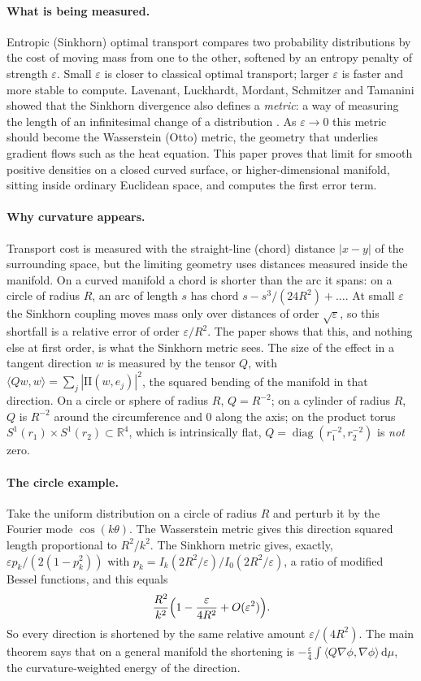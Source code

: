 \documentclass[11pt,a4paper]{article}
\theoremstyle{definition}\newtheorem{definition}[theorem]{Definition}
\theoremstyle{remark}\newtheorem{remark}[theorem]{Remark}
\newcommand{\eps}{\varepsilon}
\newcommand{\dd}{\,\mathrm d}
\newcommand{\R}{\mathbb R}
\newcommand{\II}{\mathrm{II}}
\begin{document}
\paragraph{What is being measured.} Entropic (Sinkhorn) optimal transport compares two probability distributions by the cost of moving mass from one to the other, softened by an entropy penalty of strength $\eps$. Small $\eps$ is closer to classical optimal transport; larger $\eps$ is faster and more stable to compute. Lavenant, Luckhardt, Mordant, Schmitzer and Tamanini showed that the Sinkhorn divergence also defines a \emph{metric}: a way of measuring the length of an infinitesimal change of a distribution \cite{LLMST}. As $\eps\to0$ this metric should become the Wasserstein (Otto) metric, the geometry that underlies gradient flows such as the heat equation. This paper proves that limit for smooth positive densities on a closed curved surface, or higher-dimensional manifold, sitting inside ordinary Euclidean space, and computes the first error term.

\paragraph{Why curvature appears.} Transport cost is measured with the straight-line (chord) distance $|x-y|$ of the surrounding space, but the limiting geometry uses distances measured inside the manifold. On a curved manifold a chord is shorter than the arc it spans: on a circle of radius $R$, an arc of length $s$ has chord $s-s^3/(24R^2)+\dots$. At small $\eps$ the Sinkhorn coupling moves mass only over distances of order $\sqrt\eps$, so this shortfall is a relative error of order $\eps/R^2$. The paper shows that this, and nothing else at first order, is what the Sinkhorn metric sees. The size of the effect in a tangent direction $w$ is measured by the tensor $Q$, with $\langle Qw,w\rangle=\sum_j|\II(w,e_j)|^2$, the squared bending of the manifold in that direction. On a circle or sphere of radius $R$, $Q=R^{-2}$; on a cylinder of radius $R$, $Q$ is $R^{-2}$ around the circumference and $0$ along the axis; on the product torus $S^1(r_1)\times S^1(r_2)\subset\R^4$, which is intrinsically flat, $Q=\operatorname{diag}(r_1^{-2},r_2^{-2})$ is \emph{not} zero.

\paragraph{The circle example.} Take the uniform distribution on a circle of radius $R$ and perturb it by the Fourier mode $\cos(k\theta)$. The Wasserstein metric gives this direction squared length proportional to $R^2/k^2$. The Sinkhorn metric gives, exactly, $\eps p_k/(2(1-p_k^2))$ with $p_k=I_k(2R^2/\eps)/I_0(2R^2/\eps)$, a ratio of modified Bessel functions, and this equals
\[
\frac{R^2}{k^2}\Bigl(1-\frac{\eps}{4R^2}+O(\eps^2)\Bigr).
\]
So every direction is shortened by the same relative amount $\eps/(4R^2)$. The main theorem says that on a general manifold the shortening is $-\tfrac{\eps}{4}\int\langle Q\nabla\phi,\nabla\phi\rangle\dd\mu$, the curvature-weighted energy of the direction.
\end{document}
